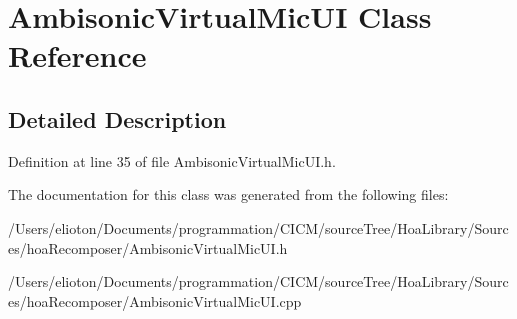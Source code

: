\hypertarget{class_ambisonic_virtual_mic_u_i}{\section{Ambisonic\-Virtual\-Mic\-U\-I Class Reference}
\label{class_ambisonic_virtual_mic_u_i}
}


\subsection{Detailed Description}


Definition at line 35 of file Ambisonic\-Virtual\-Mic\-U\-I.\-h.



The documentation for this class was generated from the following files\-:\begin{DoxyCompactItemize}
\item 
/\-Users/elioton/\-Documents/programmation/\-C\-I\-C\-M/source\-Tree/\-Hoa\-Library/\-Sources/hoa\-Recomposer/Ambisonic\-Virtual\-Mic\-U\-I.\-h\item 
/\-Users/elioton/\-Documents/programmation/\-C\-I\-C\-M/source\-Tree/\-Hoa\-Library/\-Sources/hoa\-Recomposer/Ambisonic\-Virtual\-Mic\-U\-I.\-cpp\end{DoxyCompactItemize}
